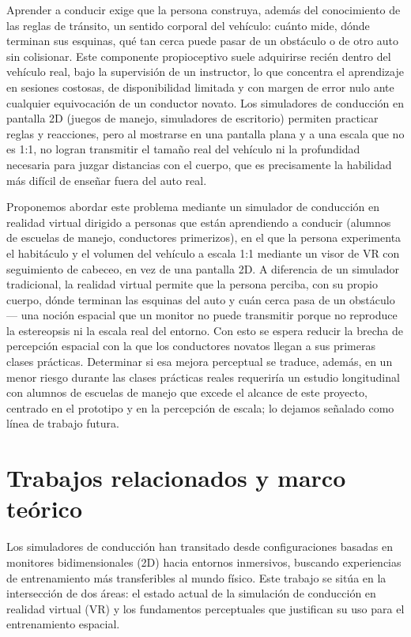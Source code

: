 \documentclass[conference]{IEEEtran}
\begin{document}
Aprender a conducir exige que la persona construya, además del conocimiento
de las reglas de tránsito, un sentido corporal del vehículo: cuánto mide,
dónde terminan sus esquinas, qué tan cerca puede pasar de un obstáculo o de
otro auto sin colisionar. Este componente propioceptivo suele adquirirse
recién dentro del vehículo real, bajo la supervisión de un instructor, lo
que concentra el aprendizaje en sesiones costosas, de disponibilidad
limitada y con margen de error nulo ante cualquier equivocación de un
conductor novato. Los simuladores de conducción en pantalla 2D (juegos de
manejo, simuladores de escritorio) permiten practicar reglas y reacciones,
pero al mostrarse en una pantalla plana y a una escala que no es 1:1,
no logran transmitir el tamaño real del vehículo ni la profundidad
necesaria para juzgar distancias con el cuerpo, que es precisamente la
habilidad más difícil de enseñar fuera del auto real.

Proponemos abordar este problema mediante un simulador de conducción en
realidad virtual dirigido a personas que están aprendiendo a conducir
(alumnos de escuelas de manejo, conductores primerizos), en el que la
persona experimenta el habitáculo y el volumen del vehículo a escala 1:1
mediante un visor de VR con seguimiento de cabeceo, en vez de una pantalla
2D. A diferencia de un simulador tradicional, la realidad virtual permite
que la persona perciba, con su propio cuerpo, dónde terminan las esquinas
del auto y cuán cerca pasa de un obstáculo — una noción espacial que un
monitor no puede transmitir porque no reproduce la estereopsis ni la
escala real del entorno. Con esto se espera reducir la brecha de
percepción espacial con la que los conductores novatos llegan a sus
primeras clases prácticas. Determinar si esa mejora perceptual se
traduce, además, en un menor riesgo durante las clases prácticas reales
requeriría un estudio longitudinal con alumnos de escuelas de manejo que
excede el alcance de este proyecto, centrado en el prototipo y en la
percepción de escala; lo dejamos señalado como línea de trabajo futura.

\section{Trabajos relacionados y marco teórico}
\label{sec:relacionados}

Los simuladores de conducción han transitado desde configuraciones basadas en monitores bidimensionales (2D) hacia entornos inmersivos, buscando experiencias de entrenamiento más transferibles al mundo físico. Este trabajo se sitúa en la intersección de dos áreas: el estado actual de la simulación de conducción en realidad virtual (VR) y los fundamentos perceptuales que justifican su uso para el entrenamiento espacial.
\end{document}
